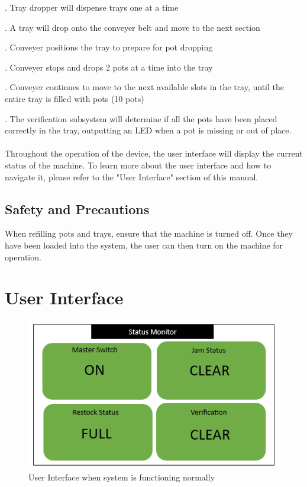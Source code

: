 \documentclass{article}
\begin{document}
 .	Tray dropper will dispense trays one at a time

 .	A tray will drop onto the conveyer belt and move to the next section

 .	Conveyer positions the tray to prepare for pot dropping

 .	Conveyer stops and drops 2 pots at a time into the tray

 .	Conveyer continues to move to the next available slots in the tray, until the entire tray is filled with pots (10 pots)

 .	The verification subsystem will determine if all the pots have been placed correctly in the tray, outputting an LED when a pot is missing or out of place. 
\\
\\ \noindent Throughout the operation of the device, the user interface will display the current status of the machine. To learn more about the user interface and how to navigate it, please refer to the "User Interface" section of this manual.
\subsection{Safety and Precautions}
When refilling pots and trays, ensure that the machine is turned off. Once they have been loaded into the system, the user can then turn on the machine for operation.
\section{User Interface}
\begin{figure}[H]
    \includegraphics{statusgood.png}
    \caption{User Interface when system is functioning normally}
    \label{fig:scope}
  \end{figure}
\end{document}
